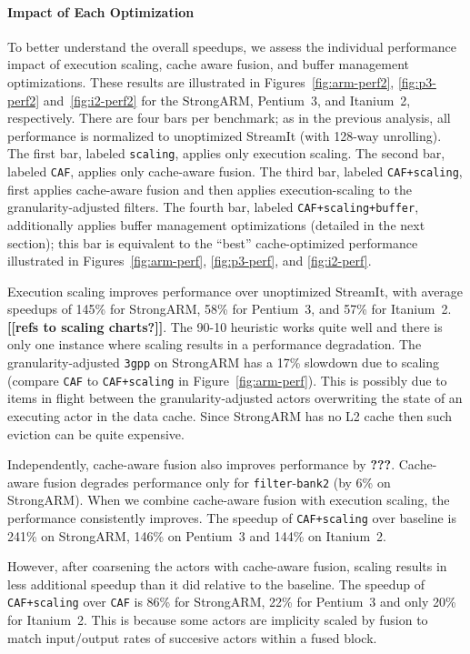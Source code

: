 \paragraph*{Impact of Each Optimization}
To better understand the overall speedups, we assess the individual
performance impact of execution scaling, cache aware fusion, and
buffer management optimizations.  These results are illustrated in
Figures~\ref{fig:arm-perf2}, \ref{fig:p3-perf2} and~\ref{fig:i2-perf2}
for the StrongARM, Pentium~3, and Itanium~2, respectively.  There are
four bars per benchmark; as in the previous analysis, all performance
is normalized to unoptimized StreamIt (with 128-way unrolling).  The
first bar, labeled {\tt scaling}, applies only execution scaling.  The
second bar, labeled {\tt CAF}, applies only cache-aware fusion.  The
third bar, labeled {\tt CAF+scaling}, first applies cache-aware fusion
and then applies execution-scaling to the granularity-adjusted
filters.  The fourth bar, labeled {\tt CAF+scaling+buffer},
additionally applies buffer management optimizations (detailed in the
next section); this bar is equivalent to the ``best'' cache-optimized
performance illustrated in Figures~\ref{fig:arm-perf},
\ref{fig:p3-perf}, and \ref{fig:i2-perf}.

Execution scaling improves performance over unoptimized StreamIt, with
average speedups of 145\% for StrongARM, 58\% for Pentium~3, and 57\%
for Itanium~2.  {\bf [[refs to scaling charts?]]}.  The 90-10
heuristic works quite well and there is only one instance where
scaling results in a performance degradation. The granularity-adjusted
\texttt{3gpp} on StrongARM has a 17\% slowdown due to scaling (compare
{\tt CAF} to {\tt CAF+scaling} in Figure~\ref{fig:arm-perf}).  This is
possibly due to items in flight between the granularity-adjusted
actors overwriting the state of an executing actor in the data cache.
Since StrongARM has no L2 cache then such eviction can be quite
expensive.

Independently, cache-aware fusion also improves performance by {\bf
???}.  Cache-aware fusion degrades performance only for
\texttt{filter}-\texttt{bank2} (by 6\% on StrongARM). When we combine
cache-aware fusion with execution scaling, the performance
consistently improves.  The speedup of \texttt{CAF+scaling} over
baseline is 241\% on StrongARM, 146\% on Pentium~3 and 144\% on
Itanium~2.

However, after coarsening the actors with cache-aware fusion, scaling
results in less additional speedup than it did relative to the
baseline.  The speedup of \texttt{CAF+scaling} over \texttt{CAF} is
86\% for StrongARM, 22\% for Pentium~3 and only 20\% for Itanium~2.
This is because some actors are implicity scaled by fusion to match
input/output rates of succesive actors within a fused block.

